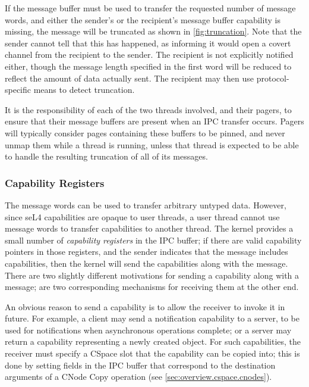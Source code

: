 If the message buffer must be used to transfer the requested number of message
words, and either the
sender's or the recipient's message buffer capability is missing, the message
will be truncated as shown in \autoref{fig:truncation}. Note that the
sender cannot tell that this has happened, as informing it would open a covert
channel from the recipient to the sender. The recipient is not explicitly
notified either, though the message length specified in the first word will be
reduced to reflect the amount of data actually sent. The recipient may then use
protocol-specific means to detect truncation.

It is the responsibility of each of the two
threads involved, and their pagers, to ensure that their message buffers are
present when an IPC transfer occurs. Pagers will typically consider pages
containing these buffers to be pinned, and never unmap them while a thread is
running, unless that thread is expected to be able to handle the resulting 
truncation of all of its messages.

\subsubsection{Capability Registers}

The message words can be used to transfer arbitrary untyped data. However, since seL4 capabilities are opaque to user threads, a user thread cannot use message words to transfer capabilities to another thread. The kernel provides a small number of \emph{capability registers} in the IPC buffer; if there are valid capability pointers in those registers, and the sender indicates that the message includes capabilities, then the kernel will send the capabilities along with the message. There are two slightly different motivations for sending a capability along with a message; are two corresponding mechanisms for receiving them at the other end. 

An obvious reason to send a capability is to allow the receiver to invoke it in future. For example, a client may send a notification capability to a server, to be used for notifications when asynchronous operations complete; or a server may return a capability representing a newly created object. For such capabilities, the receiver must specify a CSpace slot that the capability can be copied into; this is done by setting fields in the IPC buffer that correspond to the destination arguments of a CNode Copy operation (see \autoref{sec:overview.cspace.cnodes}).

